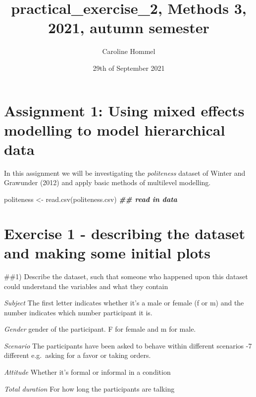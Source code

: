 \documentclass[
]{article}
\title{practical\_exercise\_2, Methods 3, 2021, autumn semester}
\author{Caroline Hommel}
\date{29th of September 2021}
\newenvironment{Shaded}{\begin{snugshade}}{\end{snugshade}}
\newcommand{\DocumentationTok}[1]{\textcolor[rgb]{0.56,0.35,0.01}{\textbf{\textit{#1}}}}
\newcommand{\FunctionTok}[1]{\textcolor[rgb]{0.00,0.00,0.00}{#1}}
\newcommand{\NormalTok}[1]{#1}
\newcommand{\OtherTok}[1]{\textcolor[rgb]{0.56,0.35,0.01}{#1}}
\newcommand{\StringTok}[1]{\textcolor[rgb]{0.31,0.60,0.02}{#1}}
\begin{document}
\maketitle

\hypertarget{assignment-1-using-mixed-effects-modelling-to-model-hierarchical-data}{%
\section{Assignment 1: Using mixed effects modelling to model
hierarchical
data}\label{assignment-1-using-mixed-effects-modelling-to-model-hierarchical-data}}

In this assignment we will be investigating the \emph{politeness}
dataset of Winter and Grawunder (2012) and apply basic methods of
multilevel modelling.

\begin{Shaded}
\begin{Highlighting}[]
\NormalTok{politeness }\OtherTok{\textless{}{-}} \FunctionTok{read.csv}\NormalTok{(}\StringTok{\textquotesingle{}politeness.csv\textquotesingle{}}\NormalTok{) }\DocumentationTok{\#\# read in data}
\end{Highlighting}
\end{Shaded}

\hypertarget{exercise-1---describing-the-dataset-and-making-some-initial-plots}{%
\section{Exercise 1 - describing the dataset and making some initial
plots}\label{exercise-1---describing-the-dataset-and-making-some-initial-plots}}

\#\#1) Describe the dataset, such that someone who happened upon this
dataset could understand the variables and what they contain

\emph{Subject} The first letter indicates whether it's a male or female
(f or m) and the number indicates which number participant it is.

\emph{Gender} gender of the participant. F for female and m for male.

\emph{Scenario} The participants have been asked to behave within
different scenarios -7 different e.g.~asking for a favor or taking
orders.

\emph{Attitude} Whether it's formal or informal in a condition

\emph{Total duration} For how long the participants are talking
\end{document}
